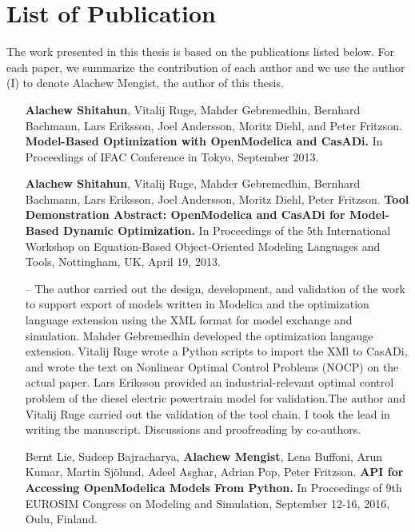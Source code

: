 \section{List of Publication}
\label{sec:List of Publication}


The work presented in this thesis is based on the publications listed below.
For each paper, we summarize the contribution of each author and we use the author (I) to denote Alachew Mengist, the author of this thesis.


\begin{itemize}
	
\item[\begin{NoHyper} \cite{alachewoptimization} \end{NoHyper} ] \textbf{Alachew Shitahun}, Vitalij Ruge, Mahder Gebremedhin, Bernhard Bachmann, Lars Eriksson, Joel Andersson, Moritz Diehl, and Peter Fritzson. \textbf{Model-Based Optimization with OpenModelica and CasADi.} In Proceedings of IFAC Conference in Tokyo, September 2013. 

\item[\begin{NoHyper} \cite{alachewoptimizationdemo} \end{NoHyper}] \textbf{Alachew Shitahun}, Vitalij Ruge, Mahder Gebremedhin, Bernhard Bachmann, Lars Eriksson, Joel Andersson, Moritz Diehl, Peter Fritzson. \textbf{Tool Demonstration Abstract: OpenModelica and CasADi for Model-Based Dynamic Optimization.} In Proceedings of the 5th International Workshop on Equation-Based Object-Oriented Modeling Languages and Tools, Nottingham, UK, April 19, 2013. 

\item[--] The author carried out the design, development, and validation of the work to support export of models written in Modelica and the optimization language extension using the XML format for model exchange and simulation. Mahder Gebremedhin developed the optimization langauge extension. Vitalij Ruge wrote a Python scripts to import the XMl to CasADi, and wrote the text on Nonlinear Optimal Control Problems (NOCP) on the actual paper. Lars Eriksson provided an industrial-relevant optimal control problem of the diesel electric powertrain model for validation.The author and Vitalij Ruge carried out the validation of the tool chain. I took the lead in writing the manuscript. Discussions and proofreading by co-authors.

\item[ \begin{NoHyper} \cite{alachewompython} \end{NoHyper}] Bernt Lie, Sudeep Bajracharya, \textbf{Alachew Mengist}, Lena Buffoni, Arun Kumar, Martin Sj\"{o}lund, Adeel Asghar, Adrian Pop, Peter Fritzson.\textbf{ API for Accessing OpenModelica Models From Python.} In Proceedings of 9th EUROSIM Congress on Modeling and Simulation, September 12-16, 2016, Oulu, Finland. 



\end{itemize}
